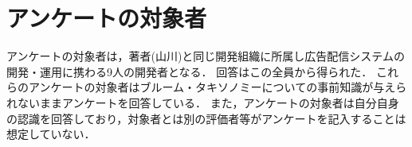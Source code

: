 \section{アンケートの対象者}
アンケートの対象者は，著者(山川)と同じ開発組織に所属し広告配信システムの開発・運用に携わる9人の開発者となる．
回答はこの全員から得られた．
これらのアンケートの対象者はブルーム・タキソノミーについての事前知識が与えられないままアンケートを回答している．
また，アンケートの対象者は自分自身の認識を回答しており，対象者とは別の評価者等がアンケートを記入することは想定していない．
